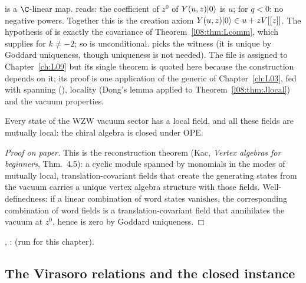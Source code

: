 \begin{dictionary}
 is a $\C$-linear map.  reads: the coefficient of $z^0$ of
$Y(u,z)|0\rangle$ is $u$;  for $q<0$: no negative powers. Together this
is the creation axiom $Y(u,z)|0\rangle\in u+zV[[z]]$. The hypothesis  of
 is exactly the covariance of Theorem~\ref{l08:thm:Lcomm}, which
 supplies for $k\ne-2$; so  is unconditional.  picks the witness
(it is unique by Goddard uniqueness, though uniqueness is not needed). The file
 is assigned to Chapter~\ref{ch:L09} but its single theorem is
quoted here because the construction depends on it; its proof is one application of the generic
\allowbreak{} of Chapter~\ref{ch:L03}, fed with spanning (),
locality (Dong's lemma applied to Theorem~\ref{l08:thm:Jlocal}) and the vacuum properties.
\end{dictionary}

\begin{physics}
Every state of the WZW vacuum sector has a local field, and all these fields are mutually local:
the chiral algebra is closed under OPE.
\end{physics}

\begin{proof}[Proof on paper]
This is the reconstruction theorem (Kac, \emph{Vertex algebras for beginners}, Thm.~4.5): a cyclic
module spanned by monomials in the modes of mutually local, translation-covariant fields that create
the generating states from the vacuum carries a unique vertex algebra structure with those fields.
Well-definedness: if a linear combination of word states vanishes, the corresponding combination of
word fields is a translation-covariant field that annihilates the vacuum at $z^0$, hence is zero by
Goddard uniqueness.
\end{proof}

\begin{status}
\allowbreak{}\allowbreak{}\allowbreak{}\allowbreak{}, : \lean{[propext, Classical.}\allowbreak{}\allowbreak\lean{sound]} (run for this chapter).
\end{status}

\subsection{The Virasoro relations and the closed instance}

